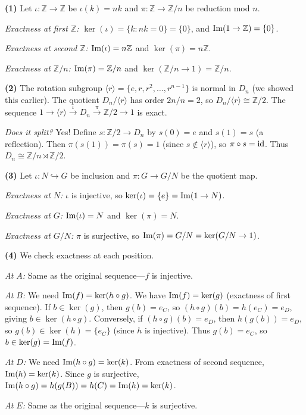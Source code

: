 \documentclass{report}
\begin{document}
\begin{solution}
\textbf{(1)} Let \(\iota : \mathbb{Z} \to \mathbb{Z}\) be \(\iota(k) = nk\) and \(\pi : \mathbb{Z} \to \mathbb{Z}/n\) be reduction mod \(n\).

\emph{Exactness at first \(\mathbb{Z}\):} \(\ker(\iota) = \{k : nk = 0\} = \{0\}\), and \(\operatorname{Im}(1 \to \mathbb{Z}) = \{0\}\). \checkmark

\emph{Exactness at second \(\mathbb{Z}\):} \(\operatorname{Im}(\iota) = n\mathbb{Z}\) and \(\ker(\pi) = n\mathbb{Z}\). \checkmark

\emph{Exactness at \(\mathbb{Z}/n\):} \(\operatorname{Im}(\pi) = \mathbb{Z}/n\) and \(\ker(\mathbb{Z}/n \to 1) = \mathbb{Z}/n\). \checkmark

\textbf{(2)} The rotation subgroup \(\langle r \rangle = \{e, r, r^2, \ldots, r^{n-1}\}\) is normal in \(D_n\) (we showed this earlier). The quotient \(D_n / \langle r \rangle\) has order \(2n/n = 2\), so \(D_n/\langle r \rangle \cong \mathbb{Z}/2\). The sequence \(1 \to \langle r \rangle \xrightarrow{\iota} D_n \xrightarrow{\pi} \mathbb{Z}/2 \to 1\) is exact.

\emph{Does it split?} Yes! Define \(s : \mathbb{Z}/2 \to D_n\) by \(s(0) = e\) and \(s(1) = s\) (a reflection). Then \(\pi(s(1)) = \pi(s) = 1\) (since \(s \notin \langle r \rangle\)), so \(\pi \circ s = \text{id}\). Thus \(D_n \cong \mathbb{Z}/n \rtimes \mathbb{Z}/2\).

\textbf{(3)} Let \(\iota : N \hookrightarrow G\) be inclusion and \(\pi : G \to G/N\) be the quotient map.

\emph{Exactness at \(N\):} \(\iota\) is injective, so \(\ker(\iota) = \{e\} = \operatorname{Im}(1 \to N)\). \checkmark

\emph{Exactness at \(G\):} \(\operatorname{Im}(\iota) = N\) and \(\ker(\pi) = N\). \checkmark

\emph{Exactness at \(G/N\):} \(\pi\) is surjective, so \(\operatorname{Im}(\pi) = G/N = \ker(G/N \to 1)\). \checkmark

\textbf{(4)} We check exactness at each position.

\emph{At \(A\):} Same as the original sequence---\(f\) is injective.

\emph{At \(B\):} We need \(\operatorname{Im}(f) = \ker(h \circ g)\). We have \(\operatorname{Im}(f) = \ker(g)\) (exactness of first sequence). If \(b \in \ker(g)\), then \(g(b) = e_C\), so \((h \circ g)(b) = h(e_C) = e_D\), giving \(b \in \ker(h \circ g)\). Conversely, if \((h \circ g)(b) = e_D\), then \(h(g(b)) = e_D\), so \(g(b) \in \ker(h) = \{e_C\}\) (since \(h\) is injective). Thus \(g(b) = e_C\), so \(b \in \ker(g) = \operatorname{Im}(f)\).

\emph{At \(D\):} We need \(\operatorname{Im}(h \circ g) = \ker(k)\). From exactness of second sequence, \(\operatorname{Im}(h) = \ker(k)\). Since \(g\) is surjective, \(\operatorname{Im}(h \circ g) = h(g(B)) = h(C) = \operatorname{Im}(h) = \ker(k)\). \checkmark

\emph{At \(E\):} Same as the original sequence---\(k\) is surjective.
\end{solution}
\end{document}
